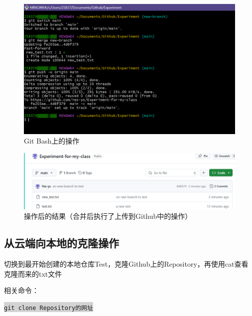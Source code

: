 \documentclass[a4paper, 12pt]{article}
\begin{document}
\begin{figure}[h]
  \centering
  \includegraphics[width=1\textwidth]{im9}
  \caption{Git Bash上的操作}
  \label{image-myimage}
\end{figure}

\begin{figure}[h!]
  \centering
  \includegraphics[width=1\textwidth]{im10}
  \caption{操作后的结果（合并后执行了上传到Github中的操作）}
  \label{image-myimage}
\end{figure}

\clearpage

  \subsection{从云端向本地的克隆操作}

切换到最开始创建的本地仓库Test，克隆Github上的Repository，再使用cat查看克隆而来的txt文件

相关命令：

\colorbox{lightgray}{\texttt{git clone Repository的网址}}
\end{document}
